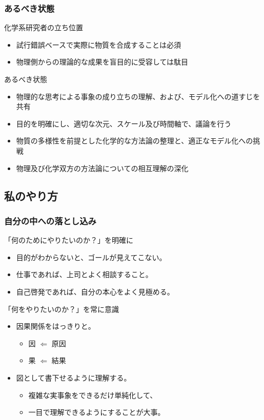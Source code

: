 \documentclass[unicode,12pt]{beamer}%
\begin{document}
\begin{frame}
    \frametitle{あるべき状態}
    \begin{exampleblock}{化学系研究者の立ち位置}
        \begin{itemize}
            \item 試行錯誤ベースで実際に物質を合成することは必須
            \item 物理側からの理論的な成果を盲目的に受容しては駄目
        \end{itemize}
    \end{exampleblock}
    \begin{alertblock}{あるべき状態}
        \begin{itemize}
            \item 物理的な思考による事象の成り立ちの理解、および、モデル化への道すじを共有
            \item 目的を明確にし、適切な次元、スケール及び時間軸で、議論を行う
            \item 物質の多様性を前提とした化学的な方法論の整理と、適正なモデル化への挑戦
            \item 物理及び化学双方の方法論についての\alert{相互理解の深化}
        \end{itemize}
    \end{alertblock}
\end{frame}


\subsection{私のやり方}

\begin{frame}
	\frametitle{自分の中への落とし込み}
		\begin{block}{「何のためにやりたいのか？」を明確に}
			\begin{itemize}
				\item 目的がわからないと、ゴールが見えてこない。
				\item 仕事であれば、上司とよく相談すること。
				\item 自己啓発であれば、自分の本心をよく見極める。
			\end{itemize}
		\end{block}
		\pause
		\begin{block}{「何をやりたいのか？」を常に意識}
			\begin{itemize}
				\item 因果関係をはっきりと。
				\begin{itemize}
					\item 因 $\Leftarrow$ 原因
					\item 果 $\Leftarrow$ 結果
				\end{itemize}
				\item 図として書下せるように理解する。
				\begin{itemize}
					\item 複雑な実事象をできるだけ単純化して、
					\item 一目で理解できるようにすることが大事。
				\end{itemize}
			\end{itemize}
		\end{block}
\end{frame}
\end{document}
